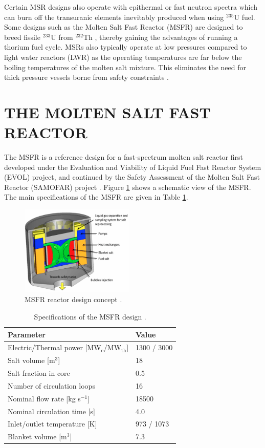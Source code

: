 \documentclass{anstrans}
\begin{document}
Certain MSR designs also operate with epithermal or fast neutron spectra which can burn off the transuranic elements inevitably produced when using $^{235}$U fuel. Some designs such as the Molten Salt Fast Reactor (MSFR) are designed to breed fissile $^{233}$U from $^{232}$Th \cite{serp_molten_2014}, thereby gaining the advantages of running a thorium fuel cycle. MSRs also typically operate at low pressures compared to light water reactors (LWR) as the operating temperatures are far below the boiling temperatures of the molten salt mixture. This eliminates the need for thick pressure vessels borne from safety constraints \cite{elsheikh_safety_2013}.

\section{THE MOLTEN SALT FAST REACTOR}

The MSFR is a reference design for a fast-spectrum molten salt reactor first developed under the Evaluation and Viability of Liquid Fuel Fast Reactor System (EVOL) project, and continued by the Safety Assessment of the Molten Salt Fast Reactor (SAMOFAR) project \cite{serp_molten_2014}. Figure \ref{fig:msfr} shows a schematic view of the MSFR. The main specifications of the MSFR are given in Table \ref{table:msfr}.

\begin{figure}[t] 
	\centering
	\includegraphics[width=0.48\textwidth]{./figures/MSFR}
	\caption{MSFR reactor design concept \cite{serp_molten_2014}.}
	\label{fig:msfr}
\end{figure} 

\begin{table}
\begin{tabular}{ l l }
\hline
Parameter & Value \\
\hline
Electric/Thermal power [MW$_{\text{e}}$/MW$_{\text{th}}$] & 1300 / 3000  \\
Salt volume [m$^3$] & 18 \\
Salt fraction in core & 0.5 \\
Number of circulation loops & 16 \\
Nominal flow rate [kg s$^{-1}$] & 18500  \\
Nominal circulation time [s] & 4.0 \\
Inlet/outlet temperature [K] & 973 / 1073 \\
Blanket volume [m$^3$] & 7.3\\
\hline
\end{tabular}
\caption{Specifications of the MSFR design \cite{serp_molten_2014}.}
\label{table:msfr}
\end{table}
\end{document}
